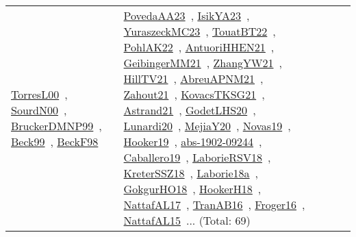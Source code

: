 {\begin{longtable}{lp{3cm}>{\raggedright\arraybackslash}p{6cm}>{\raggedright\arraybackslash}p{6cm}>{\raggedright\arraybackslash}p{8cm}}
\href{works/TorresL00.pdf}{TorresL00}~\cite{TorresL00}, \href{works/SourdN00.pdf}{SourdN00}~\cite{SourdN00}, \href{works/BruckerDMNP99.pdf}{BruckerDMNP99}~\cite{BruckerDMNP99}, \href{works/Beck99.pdf}{Beck99}~\cite{Beck99}, \href{works/BeckF98.pdf}{BeckF98}~\cite{BeckF98} & \href{works/PovedaAA23.pdf}{PovedaAA23}~\cite{PovedaAA23}, \href{works/IsikYA23.pdf}{IsikYA23}~\cite{IsikYA23}, \href{works/YuraszeckMC23.pdf}{YuraszeckMC23}~\cite{YuraszeckMC23}, \href{works/TouatBT22.pdf}{TouatBT22}~\cite{TouatBT22}, \href{works/PohlAK22.pdf}{PohlAK22}~\cite{PohlAK22}, \href{works/AntuoriHHEN21.pdf}{AntuoriHHEN21}~\cite{AntuoriHHEN21}, \href{works/GeibingerMM21.pdf}{GeibingerMM21}~\cite{GeibingerMM21}, \href{works/ZhangYW21.pdf}{ZhangYW21}~\cite{ZhangYW21}, \href{works/HillTV21.pdf}{HillTV21}~\cite{HillTV21}, \href{works/AbreuAPNM21.pdf}{AbreuAPNM21}~\cite{AbreuAPNM21}, \href{works/Zahout21.pdf}{Zahout21}~\cite{Zahout21}, \href{works/KovacsTKSG21.pdf}{KovacsTKSG21}~\cite{KovacsTKSG21}, \href{works/Astrand21.pdf}{Astrand21}~\cite{Astrand21}, \href{works/GodetLHS20.pdf}{GodetLHS20}~\cite{GodetLHS20}, \href{works/Lunardi20.pdf}{Lunardi20}~\cite{Lunardi20}, \href{works/MejiaY20.pdf}{MejiaY20}~\cite{MejiaY20}, \href{works/Novas19.pdf}{Novas19}~\cite{Novas19}, \href{works/Hooker19.pdf}{Hooker19}~\cite{Hooker19}, \href{works/abs-1902-09244.pdf}{abs-1902-09244}~\cite{abs-1902-09244}, \href{works/Caballero19.pdf}{Caballero19}~\cite{Caballero19}, \href{works/LaborieRSV18.pdf}{LaborieRSV18}~\cite{LaborieRSV18}, \href{works/KreterSSZ18.pdf}{KreterSSZ18}~\cite{KreterSSZ18}, \href{works/Laborie18a.pdf}{Laborie18a}~\cite{Laborie18a}, \href{works/GokgurHO18.pdf}{GokgurHO18}~\cite{GokgurHO18}, \href{works/HookerH18.pdf}{HookerH18}~\cite{HookerH18}, \href{works/NattafAL17.pdf}{NattafAL17}~\cite{NattafAL17}, \href{works/TranAB16.pdf}{TranAB16}~\cite{TranAB16}, \href{works/Froger16.pdf}{Froger16}~\cite{Froger16}, \href{works/NattafAL15.pdf}{NattafAL15}~\cite{NattafAL15}... (Total: 69)\\

\end{longtable}}
